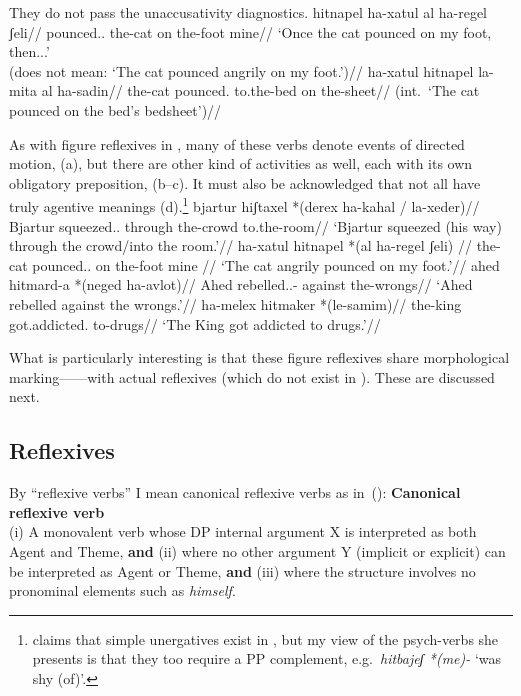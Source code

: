 They do not pass the unaccusativity diagnostics.
\ex \ljudge{\#} \begingl
		\gla hitnapel ha-xatul al ha-regel ʃeli//
		\glb pounced.. the-cat on the-foot mine//
		\glft `Once the cat pounced on my foot, then...'\\
			(does not mean: `The cat pounced angrily on my foot.')//
	\endgl
\xe
\ex \ljudge{*} \begingl
	\gla ha-xatul hitnapel la-mita al ha-sadin//
	\glb the-cat pounced. to.the-bed on the-sheet//
	\glft (int.~`The cat pounced on the bed's bedsheet')//
	\endgl
\xe

As with figure reflexives in {\tnif}, many of these verbs denote events of directed motion, (\nextx a), but there are other kind of activities as well, each with its own obligatory preposition, (\nextx b--c). It must also be acknowledged that not all have truly agentive meanings (\nextx d).\footnote{\cite{siloni08} claims that simple unergatives exist in {\thit}, but my view of the psych-verbs she presents is that they too require a PP complement, e.g.~\emph{hitbajeʃ *(me)-} `was shy (of)'.}
\pex
	\a \begingl
		\gla bjartur hiʃtaxel *(derex ha-kahal / la-xeder)//
		\glb Bjartur squeezed.. through the-crowd {} to.the-room//
		\glft `Bjartur squeezed (his way) through the crowd/into the room.'//
		\endgl
	\a \begingl
		\gla ha-xatul hitnapel *(al ha-regel ʃeli) //
		\glb the-cat pounced.. on the-foot mine //
		\glft `The cat angrily pounced on my foot.'//
		\endgl
	\a \begingl
		\gla ahed hitmard-a *(neged ha-avlot)//
		\glb Ahed rebelled..- against the-wrongs//
		\glft `Ahed rebelled against the wrongs.'//
		\endgl
	\a \begingl
		\gla ha-melex hitmaker *(le-samim)//
		\glb the-king got.addicted. to-drugs//
		\glft `The King got addicted to drugs.'//
		\endgl
\xe

What is particularly interesting is that these figure reflexives share morphological marking---\thit---with actual reflexives (which do not exist in {\tnif}). These are discussed next.

	\subsection{Reflexives} \label{vz:thit:refl}
By ``reflexive verbs'' I mean canonical reflexive verbs as in~(\nextx):
\ex \textbf{Canonical reflexive verb}\\
	(i) A monovalent verb whose DP internal argument X is interpreted as both Agent and Theme, \textbf{and} (ii) where no other argument Y (implicit or explicit) can be interpreted as Agent or Theme, \textbf{and} (iii) where the structure involves no pronominal elements such as \emph{himself}.
\xe

